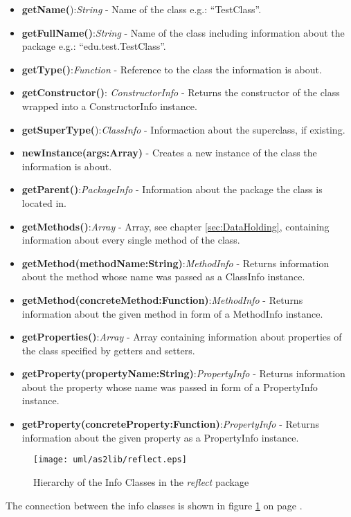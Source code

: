 \begin{itemize}
	\item \textbf{getName(}):\textit{String} - Name of the class e.g.: "`TestClass"'.
	\item \textbf{getFullName()}:\textit{String} - Name of the class including information about the package e.g.: "`edu.test.TestClass"'.
	\item \textbf{getType()}:\textit{Function} - Reference to the class the information is about.
	\item \textbf{getConstructor()}: \textit{ConstructorInfo} - Returns the constructor of the class wrapped into a ConstructorInfo instance.
	\item \textbf{getSuperType(}):\textit{ClassInfo} - Informaction about the superclass, if existing.
	\item \textbf{newInstance(args:Array)} - Creates a new instance of the class the information is about.
	\item \textbf{getParent()}:\textit{PackageInfo} - Information about the package the class is located in.
	\item \textbf{getMethods()}:\textit{Array} - Array, see chapter \ref{sec:DataHolding}, containing information about every single method of the class.
	\item \textbf{getMethod(methodName:String)}:\textit{MethodInfo} - Returns information about the method whose name was passed as a ClassInfo instance.
	\item \textbf{getMethod(concreteMethod:Function)}:\textit{MethodInfo} - Returns information about the given method in form of a MethodInfo instance.
	\item \textbf{getProperties()}:\textit{Array} - Array containing information about properties of the class specified by getters and setters.
	\item \textbf{getProperty(propertyName:String)}:\textit{PropertyInfo} - Returns information about the property whose name was passed in form of a PropertyInfo instance. 
	\item \textbf{getProperty(concreteProperty:Function)}:\textit{PropertyInfo} - Returns information about the given property as a PropertyInfo instance.
\end{itemize}

\begin{figure}
\begin{center}
\texttt{[image: uml/as2lib/reflect.eps]}
\caption{Hierarchy of the Info Classes in the \emph{reflect} package}
\label{fig:as2libreflect}
\end{center}
\end{figure}
The connection between the info classes is shown in figure \ref{fig:as2libreflect} on page \pageref{fig:as2libreflect}.
